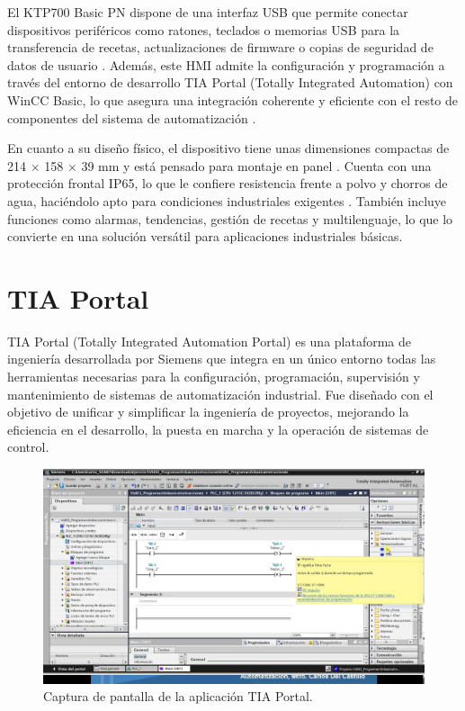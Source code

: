El KTP700 Basic PN dispone de una interfaz USB que permite conectar dispositivos periféricos como ratones, teclados o memorias USB para la transferencia de recetas, actualizaciones de firmware o copias de seguridad de datos de usuario \cite{HMI_KTP}. Además, este HMI admite la configuración y programación a través del entorno de desarrollo TIA Portal (Totally Integrated Automation) con WinCC Basic, lo que asegura una integración coherente y eficiente con el resto de componentes del sistema de automatización \cite{HMI_KTP}.

En cuanto a su diseño físico, el dispositivo tiene unas dimensiones compactas de 214 × 158 × 39 mm y está pensado para montaje en panel \cite{HMI_KTP}. Cuenta con una protección frontal IP65, lo que le confiere resistencia frente a polvo y chorros de agua, haciéndolo apto para condiciones industriales exigentes \cite{HMI_KTP}. También incluye funciones como alarmas, tendencias, gestión de recetas y multilenguaje, lo que lo convierte en una solución versátil para aplicaciones industriales básicas.

\section{TIA Portal}
\label{sec:tia_portal}

TIA Portal (Totally Integrated Automation Portal) es una plataforma de ingeniería desarrollada por Siemens que integra en un único entorno todas las herramientas necesarias para la configuración, programación, supervisión y mantenimiento de sistemas de automatización industrial. Fue diseñado con el objetivo de unificar y simplificar la ingeniería de proyectos, mejorando la eficiencia en el desarrollo, la puesta en marcha y la operación de sistemas de control.

\begin{figure} [h!]
  \begin{center}
    \includegraphics[width=14cm]{figs/TIA_portal}
  \end{center}
  \caption{\centering Captura de pantalla de la aplicación TIA Portal.}
  \label{fig:TIA_portal}
\end{figure} 

